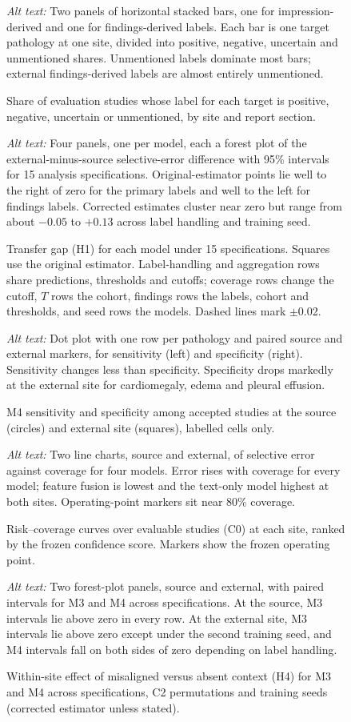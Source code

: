 \documentclass[12pt,a4paper]{article}
\newcommand{\alttext}[1]{\par\smallskip\noindent\textit{Alt text:} #1}
\begin{document}
\begin{figure}[H]
\caption{Share of evaluation studies whose label for each target is positive,
negative, uncertain or unmentioned, by site and report section.}
\label{fig:labels}
\alttext{Two panels of horizontal stacked bars, one for impression-derived and
one for findings-derived labels. Each bar is one target pathology at one site,
divided into positive, negative, uncertain and unmentioned shares. Unmentioned
labels dominate most bars; external findings-derived labels are almost
entirely unmentioned.}
\end{figure}

\begin{figure}[H]
\caption{Transfer gap (H1) for each model under 15 specifications. Squares use
the original estimator. Label-handling and aggregation rows share predictions,
thresholds and cutoffs; coverage rows change the cutoff, $T$ rows the cohort,
findings rows the labels, cohort and thresholds, and seed rows the models.
Dashed lines mark $\pm$0.02.}
\label{fig:spec}
\alttext{Four panels, one per model, each a forest plot of the external-minus-source
selective-error difference with 95\% intervals for 15 analysis
specifications. Original-estimator points lie well to the right of zero for the
primary labels and well to the left for findings labels. Corrected estimates
cluster near zero but range from about $-0.05$ to $+0.13$ across label handling
and training seed.}
\end{figure}

\begin{figure}[H]
\caption{M4 sensitivity and specificity among accepted studies at the source
(circles) and external site (squares), labelled cells only.}
\label{fig:operating}
\alttext{Dot plot with one row per pathology and paired source and external
markers, for sensitivity (left) and specificity (right). Sensitivity changes
less than specificity. Specificity drops markedly at the external site for cardiomegaly, edema
and pleural effusion.}
\end{figure}

\begin{figure}[H]
\caption{Risk--coverage curves over evaluable studies (C0) at each site,
ranked by the frozen confidence score. Markers show the frozen operating point.}
\label{fig:rc}
\alttext{Two line charts, source and external, of selective error against
coverage for four models. Error rises with coverage for every model; feature
fusion is lowest and the text-only model highest at both sites. Operating-point
markers sit near 80\% coverage.}
\end{figure}

\begin{figure}[H]
\caption{Within-site effect of misaligned versus absent context (H4) for M3
and M4 across specifications, C2 permutations and training seeds (corrected
estimator unless stated).}
\label{fig:h4}
\alttext{Two forest-plot panels, source and external, with paired intervals for
M3 and M4 across specifications. At the source, M3 intervals lie above zero in
every row. At the external site, M3 intervals lie above zero except under the
second training seed, and M4 intervals fall on both sides of zero depending on
label handling.}
\end{figure}
\end{document}
